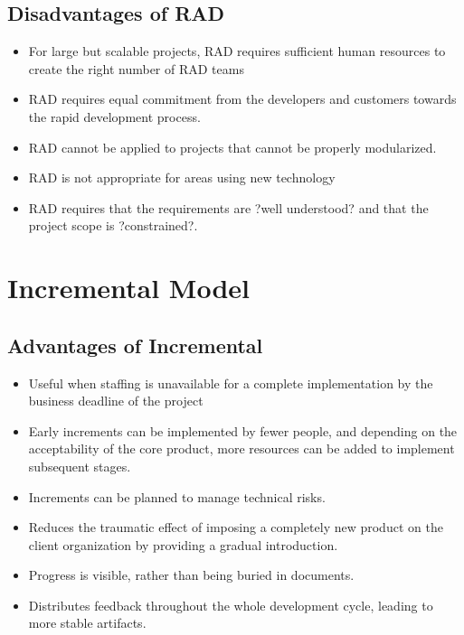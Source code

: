 \documentclass{article}
\begin{document}
\subsection{Disadvantages of RAD}
\begin{itemize}
\item        For large but scalable projects, RAD requires sufficient human resources to create the right number of RAD teams
\item        RAD requires equal commitment from the developers and customers towards the rapid development process.
\item        RAD cannot be applied to projects that cannot be properly modularized.
\item        RAD is not appropriate for areas using new technology
\item        RAD requires that the requirements are ?well understood? and that the project scope is ?constrained?.
\end{itemize}


\newpage{}
\section{Incremental Model}
\subsection{Advantages of Incremental}
\begin{itemize}
\item        Useful when staffing is unavailable for a complete implementation by the business deadline of the project
\item        Early increments can be implemented by fewer people, and depending on the acceptability of the core product, more resources can be added to implement subsequent stages.
\item        Increments can be planned to manage technical risks.
\item        Reduces the traumatic effect of imposing a completely new product on the client organization by providing a gradual introduction.
\item        Progress is visible, rather than being buried in documents.
\item        Distributes feedback throughout the whole development cycle, leading to more stable artifacts.
\end{itemize}
\end{document}
